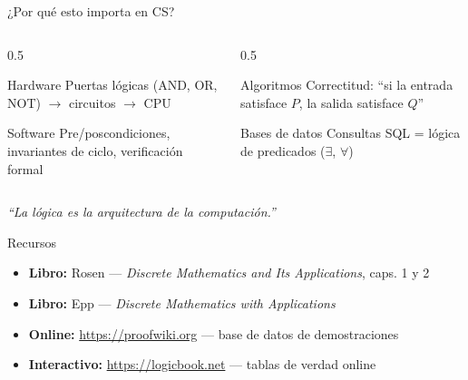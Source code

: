 \documentclass[aspectratio=169,10pt]{beamer}
\begin{document}
\begin{frame}{¿Por qué esto importa en CS?}

\begin{columns}
\begin{column}{0.5\textwidth}
\begin{block}{Hardware}
Puertas lógicas (AND, OR, NOT) $\to$ circuitos $\to$ CPU
\end{block}
\begin{block}{Software}
Pre/poscondiciones, invariantes de ciclo, verificación formal
\end{block}
\end{column}
\begin{column}{0.5\textwidth}
\begin{block}{Algoritmos}
Correctitud: ``si la entrada satisface $P$, la salida satisface $Q$''
\end{block}
\begin{block}{Bases de datos}
Consultas SQL = lógica de predicados ($\exists$, $\forall$)
\end{block}
\end{column}
\end{columns}

\vfill
\hfill\textit{``La lógica es la arquitectura de la computación.''}
\end{frame}

\begin{frame}{Recursos}
\begin{itemize}
\item \textbf{Libro:} Rosen — \textit{Discrete Mathematics and Its Applications}, caps. 1 y 2
\item \textbf{Libro:} Epp — \textit{Discrete Mathematics with Applications}
\item \textbf{Online:} \url{https://proofwiki.org} — base de datos de demostraciones
\item \textbf{Interactivo:} \url{https://logicbook.net} — tablas de verdad online
\end{itemize}
\end{frame}
\end{document}
